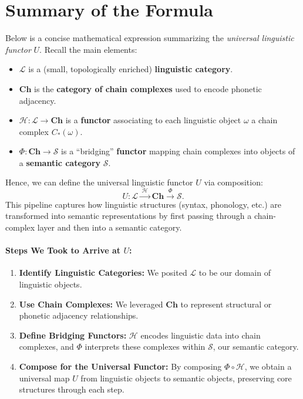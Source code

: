 \documentclass[12pt]{article}
\theoremstyle{plain}
\theoremstyle{definition}
\begin{document}
\section{Summary of the Formula}
\label{sec:summary_formula}

Below is a concise mathematical expression summarizing the \emph{universal linguistic functor} $U$. 
Recall the main elements:

\begin{itemize}
    \item $\mathcal{L}$ is a (small, topologically enriched) \textbf{linguistic category}.
    \item $\mathbf{Ch}$ is the \textbf{category of chain complexes} used to encode phonetic adjacency.
    \item $\mathcal{H} : \mathcal{L} \to \mathbf{Ch}$ is a \textbf{functor} associating to each 
    linguistic object $\omega$ a chain complex $C_\ast(\omega)$.
    \item $\Phi : \mathbf{Ch} \to \mathcal{S}$ is a “bridging” \textbf{functor} mapping chain complexes 
    into objects of a \textbf{semantic category} $\mathcal{S}$.
\end{itemize}

\noindent
Hence, we can define the universal linguistic functor $U$ via composition:
\[
U : \mathcal{L} \xrightarrow{\;\mathcal{H}\;} \mathbf{Ch} \xrightarrow{\;\Phi\;} \mathcal{S}.
\]
This pipeline captures how linguistic structures (syntax, phonology, etc.) are transformed into semantic 
representations by first passing through a chain-complex layer and then into a semantic category.

\paragraph{Steps We Took to Arrive at $U$:}
\begin{enumerate}
    \item \textbf{Identify Linguistic Categories:} 
    We posited $\mathcal{L}$ to be our domain of linguistic objects.

    \item \textbf{Use Chain Complexes:} 
    We leveraged $\mathbf{Ch}$ to represent structural or phonetic adjacency relationships.

    \item \textbf{Define Bridging Functors:} 
    $\mathcal{H}$ encodes linguistic data into chain complexes, and $\Phi$ interprets these complexes 
    within $\mathcal{S}$, our semantic category.

    \item \textbf{Compose for the Universal Functor:} 
    By composing $\Phi \circ \mathcal{H}$, we obtain a universal map $U$ from linguistic objects to 
    semantic objects, preserving core structures through each step.
\end{enumerate}
\end{document}
